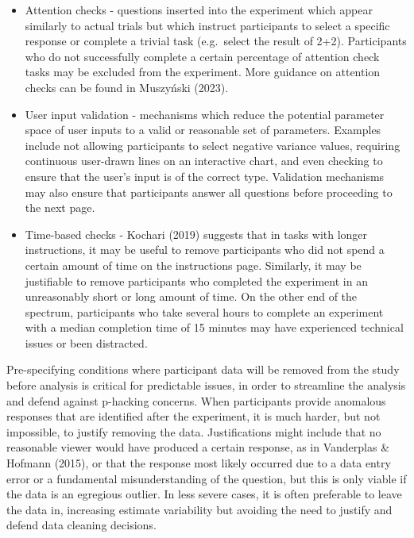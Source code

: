 \documentclass[
  10pt,
  letterpaper,
  DIV=11,
  numbers=noendperiod]{scrartcl}
\begin{document}
\begin{itemize}
\item
  Attention checks - questions inserted into the experiment which appear
  similarly to actual trials but which instruct participants to select a
  specific response or complete a trivial task (e.g.~select the result
  of 2+2). Participants who do not successfully complete a certain
  percentage of attention check tasks may be excluded from the
  experiment. More guidance on attention checks can be found in
  Muszyński (2023).
\item
  User input validation - mechanisms which reduce the potential
  parameter space of user inputs to a valid or reasonable set of
  parameters. Examples include not allowing participants to select
  negative variance values, requiring continuous user-drawn lines on an
  interactive chart, and even checking to ensure that the user's input
  is of the correct type. Validation mechanisms may also ensure that
  participants answer all questions before proceeding to the next page.
\item
  Time-based checks - Kochari (2019) suggests that in tasks with longer
  instructions, it may be useful to remove participants who did not
  spend a certain amount of time on the instructions page. Similarly, it
  may be justifiable to remove participants who completed the experiment
  in an unreasonably short or long amount of time. On the other end of
  the spectrum, participants who take several hours to complete an
  experiment with a median completion time of 15 minutes may have
  experienced technical issues or been distracted.
\end{itemize}

Pre-specifying conditions where participant data will be removed from
the study before analysis is critical for predictable issues, in order
to streamline the analysis and defend against p-hacking concerns. When
participants provide anomalous responses that are identified after the
experiment, it is much harder, but not impossible, to justify removing
the data. Justifications might include that no reasonable viewer would
have produced a certain response, as in Vanderplas \& Hofmann (2015), or
that the response most likely occurred due to a data entry error or a
fundamental misunderstanding of the question, but this is only viable if
the data is an egregious outlier. In less severe cases, it is often
preferable to leave the data in, increasing estimate variability but
avoiding the need to justify and defend data cleaning decisions.
\end{document}
